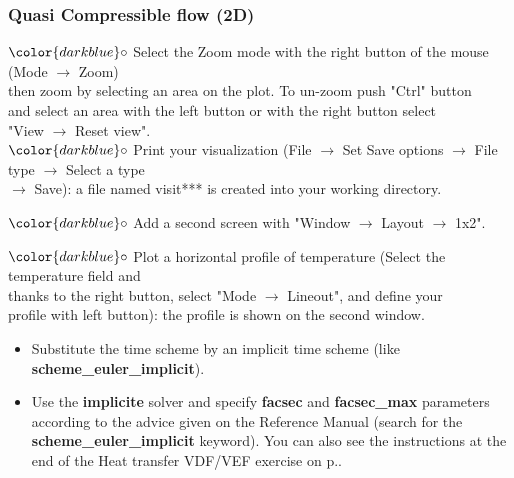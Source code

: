 \documentclass[10pt, hyperref={unicode=true,pdfusetitle, bookmarks=true,bookmarksnumbered=false,bookmarksopen=false, breaklinks=false,pdfborder={0 0l 1},backref=true,colorlinks=true,linkcolor=darkblue,pageanchor}]{beamer}
\begin{document}
\begin{frame}
\frametitle{Quasi Compressible flow (2D)}
\begin{block}{}

\hspace{1cm} $\color{darkblue}\circ$ {\small{Select the Zoom mode with the right button of the mouse (Mode $\rightarrow$ Zoom) \\
\hspace{1.3cm}  then zoom by selecting an area on the plot. To un-zoom push "Ctrl" button \\
\hspace{1.3cm}  and select an area with the left button or with the right button select \\
\hspace{1.3cm}  "View $\rightarrow$ Reset view".}}\\
\hspace{1cm} $\color{darkblue}\circ$ {\small{Print your visualization (File $\rightarrow$ Set Save options $\rightarrow$ File type $\rightarrow$ Select a type \\
\hspace{1.3cm}  $\rightarrow$ Save): a file named visit*** is created into your working directory.}}

\hspace{1cm} $\color{darkblue}\circ$ {\small{Add a second screen with "Window $\rightarrow$ Layout $\rightarrow$ 1x2".}}

\hspace{1cm} $\color{darkblue}\circ$ {\small{Plot a horizontal profile of temperature  (Select the temperature field and \\
\hspace{1.3cm} thanks to the right button, select "Mode $\rightarrow$ Lineout", and define your \\
\hspace{1.3cm} profile with left button): the profile is shown on the second window.}}

\begin{itemize}
\item Substitute the time scheme by an implicit time scheme (like \textbf{scheme\_euler\_implicit}). 

\item Use the \textbf{implicite} solver and specify \textbf{facsec} and \textbf{facsec\_max} parameters according to the advice given on the Reference Manual (search for the \textbf{scheme\_euler\_implicit} keyword). You can also see the instructions at the end of the Heat transfer VDF/VEF exercise on p.\pageref{schema_impl}.
\end{itemize}

\end{block}
\end{frame}
\end{document}
